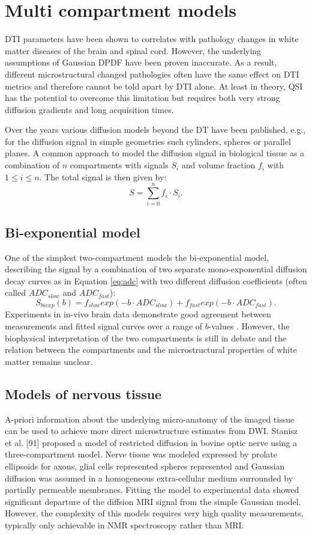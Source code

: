 \section{Multi compartment models}
DTI parameters have been shown to correlates with pathology changes in white matter diseases of the brain and spinal cord. However, the underlying assumptions of Gaussian DPDF have been proven inaccurate. As a result, different microstructural changed pathologies often have the same effect on DTI metrics and therefore cannot be told apart by DTI alone. At least in theory, QSI has the potential to overcome this limitation but requires both very strong diffusion gradients and long acquisition times.

Over the years various diffusion models beyond the DT have been published, e.g., for the diffusion signal in simple geometries such cylinders, spheres or parallel planes\cite{TODO}. A common approach to model the diffusion signal in biological tissue as a combination of $n$ compartments with signals $S_i$ and volume fraction $f_i$ with $1 \le i \le n$. The total signal is then given by:
\begin{equation}
	S=\sum_{i=0}^{n}f_i\cdot S_i.
\end{equation}
\subsection*{Bi-exponential model}
One of the simplest two-compartment models the bi-exponential model, describing the signal by a combination of two separate mono-exponential diffusion decay curves as in Equation \ref{eq:adc} with two different diffusion coefficients (often called $ADC_{slow}$ and $ADC_{fast}$):
\begin{equation}
	S_{biexp}(b) = f_{slow} exp(-b\cdot ADC_{slow}) + f_{fast} exp(-b\cdot ADC_{fast}).
\end{equation}
Experiments in in-vivo brain data demonstrate good agreement between measurements and fitted signal curves over a range of $b$-values \cite{clark02}. However, the biophysical interpretation of the two compartments is still in debate and the relation between the compartments and the microstructural properties of white matter remains unclear. 
\subsection*{Models of nervous tissue}
A-priori information about the underlying micro-anatomy of the imaged tissue can be used to achieve more direct microstructure estimates from DWI. Stanisz et al. [91] proposed a model of restricted diffusion in bovine optic nerve using a three-compartment model. Nerve tissue was modeled expressed by prolate ellipsoids for axons, glial cells represented spheres represented and Gaussian diffusion was assumed in a homogeneous extra-cellular medium surrounded by partially permeable membranes. Fitting the model to experimental data showed significant departure of the diffsion MRI signal from the simple Gaussian model. However, the complexity of this models requires very high quality measurements, typically only achievable in NMR spectroscopy rather than MRI.


